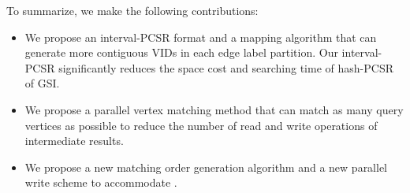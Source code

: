  To summarize, we make the following contributions:
 \begin{itemize}
  \item We propose an interval-PCSR format and a mapping algorithm that can generate more contiguous VIDs in each edge label partition. Our interval-PCSR significantly reduces the space cost and searching time of hash-PCSR of GSI.
  \item We propose a parallel vertex matching method that can match as many query vertices as possible to reduce the number of read and write operations of intermediate results.
  \item We propose a new matching order generation algorithm and a new parallel write scheme to accommodate \SystemName.
\end{itemize}
